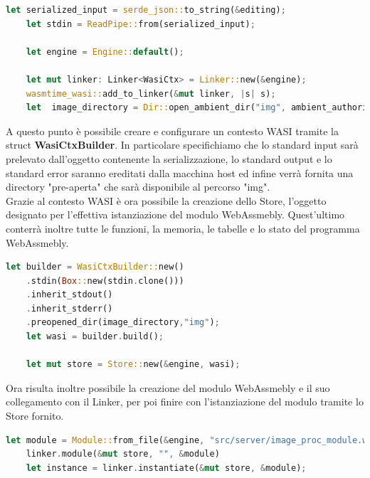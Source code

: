 \begin{lstlisting}[language=rust, showstringspaces=false]
    let serialized_input = serde_json::to_string(&editing);
    let stdin = ReadPipe::from(serialized_input);
    
    let engine = Engine::default();
    
    let mut linker: Linker<WasiCtx> = Linker::new(&engine);
    wasmtime_wasi::add_to_linker(&mut linker, |s| s); 
    let  image_directory = Dir::open_ambient_dir("img", ambient_authority());
\end{lstlisting}
A questo punto è possibile creare e configurare un contesto WASI tramite la struct \textbf{WasiCtxBuilder}.
In particolare specifichiamo che lo standard input sarà prelevato dall'oggetto contenente la serializzazione, lo standard output e lo standard error saranno ereditati dalla macchina host ed infine verrà fornita una directory "pre-aperta" che sarà disponibile al percorso "img".
\\Grazie al contesto WASI è ora possibile la creazione dello Store, l'oggetto designato per l'effettiva istanziazione del modulo WebAssmebly. Quest'ultimo conterrà inoltre tutte le funzioni, la memoria, le tabelle e lo stato del programma WebAssmebly.
\begin{lstlisting}[language=rust, showstringspaces=false]
    let builder = WasiCtxBuilder::new()
    .stdin(Box::new(stdin.clone()))
    .inherit_stdout()
    .inherit_stderr()
    .preopened_dir(image_directory,"img");
    let wasi = builder.build();
    
    let mut store = Store::new(&engine, wasi);
\end{lstlisting}
Ora risulta inoltre possibile la creazione del modulo WebAssmebly e il suo collegamento con il Linker, per poi finire con l'istanziazione del modulo tramite lo Store fornito.
\begin{lstlisting}[language=rust, showstringspaces=false]
    let module = Module::from_file(&engine, "src/server/image_proc_module.wasm");
    linker.module(&mut store, "", &module) 
    let instance = linker.instantiate(&mut store, &module);
\end{lstlisting}
